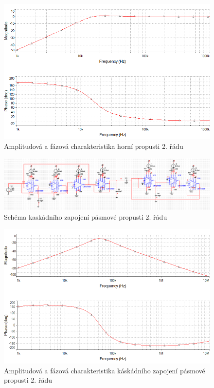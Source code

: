 \documentclass[twoside]{article}
\begin{document}
\begin{figure}[H]
\centering
\includegraphics[scale=0.6]{hp.png}
\caption{Amplitudová a fázová charakteristika horní propusti 2. řádu}
\end{figure}
\begin{figure}[H]
\centering
\includegraphics[scale=0.6]{bp2.png}
\caption{Schéma kaskádního zapojení pásmové propusti 2. řádu}
\end{figure}
\begin{figure}[H]
\centering
\includegraphics[scale=0.6]{bp22.png}
\caption{Amplitudová a fázová charakteristika káskádního zapojení pásmové propusti 2. řádu}
\end{figure}
\end{document}
